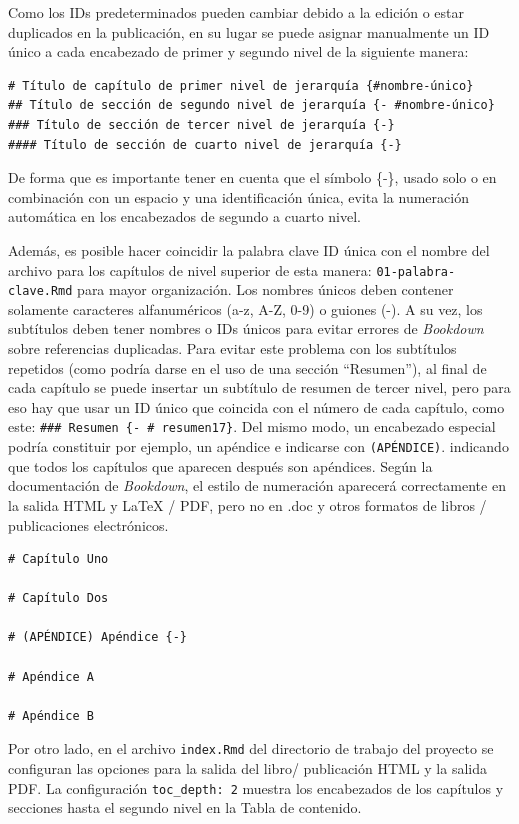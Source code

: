 \documentclass[
]{book}
\begin{document}
Como los IDs predeterminados pueden cambiar debido a la edición o estar duplicados en la publicación, en su lugar se puede asignar manualmente un ID único a cada encabezado de primer y segundo nivel de la siguiente manera:

\begin{verbatim}
# Título de capítulo de primer nivel de jerarquía {#nombre-único}
## Título de sección de segundo nivel de jerarquía {- #nombre-único}
### Título de sección de tercer nivel de jerarquía {-}
#### Título de sección de cuarto nivel de jerarquía {-}
\end{verbatim}

De forma que es importante tener en cuenta que el símbolo \{-\}, usado solo o en combinación con un espacio y una identificación única, evita la numeración automática en los encabezados de segundo a cuarto nivel.

Además, es posible hacer coincidir la palabra clave ID única con el nombre del archivo para los capítulos de nivel superior de esta manera: \texttt{01-palabra-clave.Rmd} para mayor organización. Los nombres únicos deben contener solamente caracteres alfanuméricos (a-z, A-Z, 0-9) o guiones (-). A su vez, los subtítulos deben tener nombres o IDs únicos para evitar errores de \emph{Bookdown} sobre referencias duplicadas. Para evitar este problema con los subtítulos repetidos (como podría darse en el uso de una sección ``Resumen''), al final de cada capítulo se puede insertar un subtítulo de resumen de tercer nivel, pero para eso hay que usar un ID único que coincida con el número de cada capítulo, como este: \texttt{\#\#\#\ Resumen\ \{-\ \#\ resumen17\}}. Del mismo modo, un encabezado especial podría constituir por ejemplo, un apéndice e indicarse con \texttt{(APÉNDICE)}. indicando que todos los capítulos que aparecen después son apéndices. Según la documentación de \emph{Bookdown}, el estilo de numeración aparecerá correctamente en la salida HTML y LaTeX / PDF, pero no en .doc y otros formatos de libros / publicaciones electrónicos.

\begin{verbatim}
# Capítulo Uno

# Capítulo Dos

# (APÉNDICE) Apéndice {-}

# Apéndice A

# Apéndice B
\end{verbatim}

Por otro lado, en el archivo \texttt{index.Rmd} del directorio de trabajo del proyecto se configuran las opciones para la salida del libro/ publicación HTML y la salida PDF. La configuración \texttt{toc\_depth:\ 2} muestra los encabezados de los capítulos y secciones hasta el segundo nivel en la Tabla de contenido.
\end{document}
